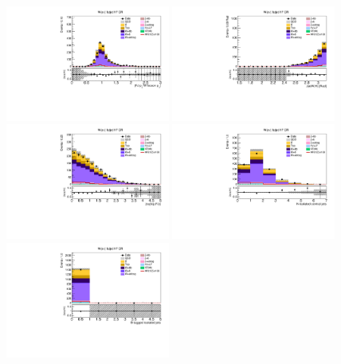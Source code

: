\begin{figure}[tbp]
  \begin{center}
    \includegraphics[width=0.48\textwidth]{figures/wlnhbb2016/boosted/WenWHHeavyFlavorFJCR_fj1WPtBalance.pdf}
    \includegraphics[width=0.48\textwidth]{figures/wlnhbb2016/boosted/WenWHHeavyFlavorFJCR_deltaPhiVH.pdf}
    \includegraphics[width=0.48\textwidth]{figures/wlnhbb2016/boosted/WenWHHeavyFlavorFJCR_dEtal1fj1.pdf}
    \includegraphics[width=0.48\textwidth]{figures/wlnhbb2016/boosted/WenWHHeavyFlavorFJCR_nIsojet.pdf}
    \includegraphics[width=0.48\textwidth]{figures/wlnhbb2016/boosted/WenWHHeavyFlavorFJCR_isojetNBtags.pdf}

\end{center}
\end{figure}
